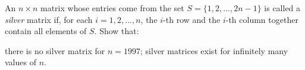 An $n \times n$ matrix whose entries come
from the set $S = \{1, 2, \dots , 2n - 1\}$
is called a \emph{silver} matrix if,
for each $i = 1, 2, \dots , n$,
the $i$-th row and the $i$-th column together
contain all elements of $S$. Show that:
\begin{enumerate}[(a)]
\ii there is no silver matrix for $n = 1997$;
\ii silver matrices exist for infinitely many values of $n$.
\end{enumerate}